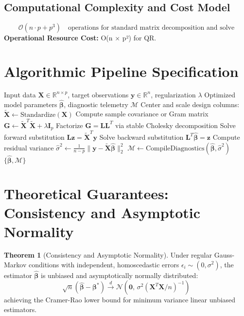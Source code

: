 \documentclass[11pt,a4paper]{article}
\theoremstyle{definition}
\newtheorem{theorem}{\textbf{Theorem}}[section]
\begin{document}
\subsection{Computational Complexity and Cost Model}
\begin{equation}
\mathcal{O}(n \cdot p + p^3) \quad \text{operations for standard matrix decomposition and solve}
\end{equation}
\textbf{Operational Resource Cost:} O(n × p²) for QR.

\section{Algorithmic Pipeline Specification}

\begin{algorithm}[H]
\caption{Ordinary least squares Execution}
\begin{algorithmic}[1]
\Require Input data $\mathbf{X} \in \mathbb{R}^{n \times p}$, target observations $\mathbf{y} \in \mathbb{R}^n$, regularization $\lambda$
\Ensure Optimized model parameters $\hat{\boldsymbol{\beta}}$, diagnostic telemetry $\mathcal{M}$
\State Center and scale design columns: $\tilde{\mathbf{X}} \gets \text{Standardize}(\mathbf{X})$
\State Compute sample covariance or Gram matrix $\mathbf{G} \gets \tilde{\mathbf{X}}^T \tilde{\mathbf{X}} + \lambda \mathbf{I}_p$
\State Factorize $\mathbf{G} = \mathbf{L} \mathbf{L}^T$ via stable Cholesky decomposition
\State Solve forward substitution $\mathbf{L} \mathbf{z} = \tilde{\mathbf{X}}^T \mathbf{y}$
\State Solve backward substitution $\mathbf{L}^T \hat{\boldsymbol{\beta}} = \mathbf{z}$
\State Compute residual variance $\hat{\sigma}^2 \gets \frac{1}{n - p} \| \mathbf{y} - \tilde{\mathbf{X}} \hat{\boldsymbol{\beta}} \|_2^2$
\State $\mathcal{M} \gets \text{CompileDiagnostics}(\hat{\boldsymbol{\beta}}, \hat{\sigma}^2)$
\State \Return $\{\hat{\boldsymbol{\beta}}, \mathcal{M}\}$
\end{algorithmic}
\end{algorithm}

\section{Theoretical Guarantees: Consistency and Asymptotic Normality}

\begin{theorem}[Consistency and Asymptotic Normality]
Under regular Gauss-Markov conditions with independent, homoscedastic errors $\epsilon_i \sim (0, \sigma^2)$, the estimator $\hat{\boldsymbol{\beta}}$ is unbiased and asymptotically normally distributed:
\begin{equation}
\sqrt{n}(\hat{\boldsymbol{\beta}} - \boldsymbol{\beta}^*) \xrightarrow{d} \mathcal{N}\left(\mathbf{0}, \, \sigma^2 (\mathbf{X}^T \mathbf{X} / n)^{-1}\right)
\end{equation}
achieving the Cramer-Rao lower bound for minimum variance linear unbiased estimators.
\end{theorem}
\end{document}
